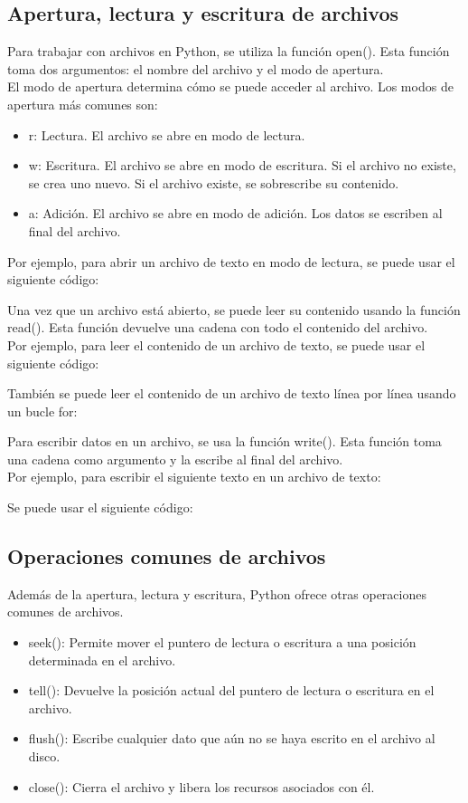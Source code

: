 \subsection{Apertura, lectura y escritura de archivos}
Para trabajar con archivos en Python, se utiliza la función open(). Esta función toma dos argumentos: el nombre del archivo y el modo de apertura.\\

El modo de apertura determina cómo se puede acceder al archivo. Los modos de apertura más comunes son:
\begin{itemize}
    \item r: Lectura. El archivo se abre en modo de lectura.
    \item w: Escritura. El archivo se abre en modo de escritura. Si el archivo no existe, se crea uno nuevo. Si el archivo existe, se sobrescribe su contenido.
    \item a: Adición. El archivo se abre en modo de adición. Los datos se escriben al final del archivo.
\end{itemize}

Por ejemplo, para abrir un archivo de texto en modo de lectura, se puede usar el siguiente código:

Una vez que un archivo está abierto, se puede leer su contenido usando la función read(). Esta función devuelve una cadena con todo el contenido del archivo.\\

Por ejemplo, para leer el contenido de un archivo de texto, se puede usar el siguiente código:

También se puede leer el contenido de un archivo de texto línea por línea usando un bucle for:

Para escribir datos en un archivo, se usa la función write(). Esta función toma una cadena como argumento y la escribe al final del archivo.\\

Por ejemplo, para escribir el siguiente texto en un archivo de texto:

Se puede usar el siguiente código:

\subsection{Operaciones comunes de archivos}
Además de la apertura, lectura y escritura, Python ofrece otras operaciones comunes de archivos.

\begin{itemize}
    \item seek(): Permite mover el puntero de lectura o escritura a una posición determinada en el archivo.
    \item tell(): Devuelve la posición actual del puntero de lectura o escritura en el archivo.
    \item flush(): Escribe cualquier dato que aún no se haya escrito en el archivo al disco.
    \item close(): Cierra el archivo y libera los recursos asociados con él.
\end{itemize}

